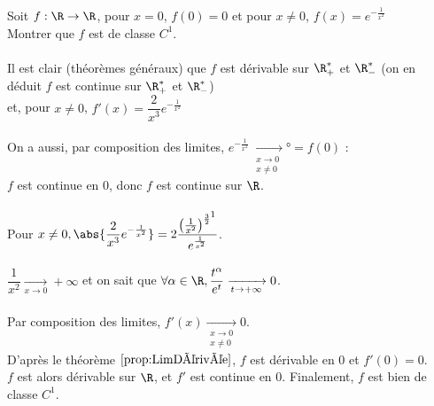 \documentclass[12pt,a4paper]{report}
\begin{document}
\begin{exemple}
Soit $f:\R \to \R$, pour $x=0$, $f(0)=0$ et pour $x\neq0$, $f(x)=e^{-\frac{1}{x^2}}$\\
Montrer que $f$ est de classe $C^1$. \\ \\
Il est clair (théorèmes généraux) que $f$ est dérivable sur $\R_+^*$ et $\R_-^*$ (on en déduit $f$ est continue sur $\R_+^*$ et $\R_-^*$) \\
et, pour $x \neq 0$, $f'(x) = \dfrac{2}{x^3}e^{-\frac{1}{x^2}}$ \\ \\
On a aussi, par composition des limites, $e^{-\frac{1}{x^2}} \xrightarrow[\substack{x \to 0 \\ x \neq 0}]{} ° = f(0)$ : \\
$f$ est continue en $0$, donc $f$ est continue sur $\R$. \\ \\
Pour $x \neq 0, \abs{\dfrac{2}{x^3}e^{-\frac{1}{x^2}}} = 2 \dfrac{\left(\frac{1}{x^2}\right)^{\frac{3}{2} \footnotemark}}{e^{\frac{1}{x^2}}}$. \\ \\
$\dfrac{1}{x^2} \xrightarrow[x \to 0]{} +\infty$ et on sait que $\forall \alpha \in \R, \dfrac{t^{\alpha}}{e^t} \xrightarrow[t \to +\infty]{} 0$. \\ \\
Par composition des limites, $f'(x) \xrightarrow[\substack{x \to 0 \\ x \neq 0}]{} 0$. \\
D'après le théorème $\ref{prop:LimDérivée}$, $f$ est dérivable en $0$ et $f'(0) = 0$. \\
$f$ est alors dérivable sur $\R$, et $f'$ est continue en $0$. Finalement, $f$ est bien de classe $C^1$.
\end{exemple}


\pagebreak
\end{document}

